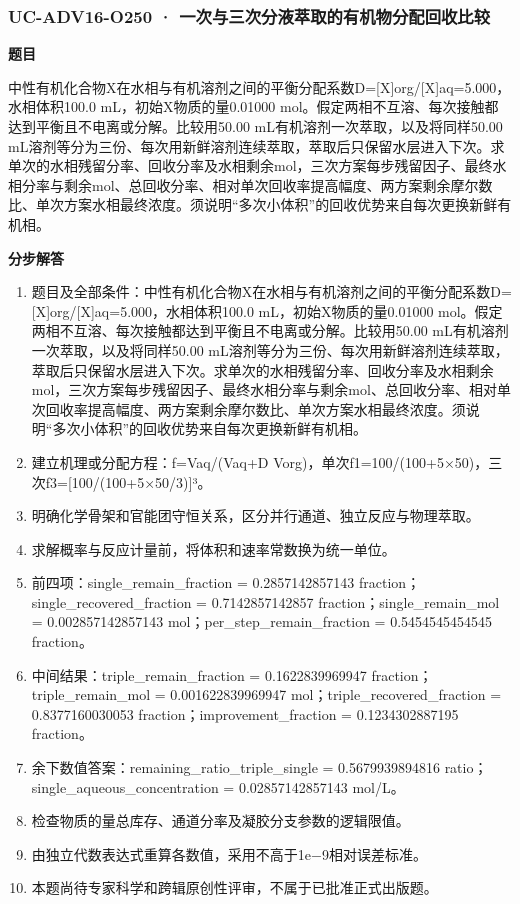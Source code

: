 \documentclass[UTF8,11pt,a4paper]{ctexart}
\begin{document}
\subsubsection*{UC-ADV16-O250 · 一次与三次分液萃取的有机物分配回收比较}
\noindent\textbf{题目}\par
中性有机化合物X在水相与有机溶剂之间的平衡分配系数D=[X]org/[X]aq=5.000，水相体积100.0 mL，初始X物质的量0.01000 mol。假定两相不互溶、每次接触都达到平衡且不电离或分解。比较用50.00 mL有机溶剂一次萃取，以及将同样50.00 mL溶剂等分为三份、每次用新鲜溶剂连续萃取，萃取后只保留水层进入下次。求单次的水相残留分率、回收分率及水相剩余mol，三次方案每步残留因子、最终水相分率与剩余mol、总回收分率、相对单次回收率提高幅度、两方案剩余摩尔数比、单次方案水相最终浓度。须说明“多次小体积”的回收优势来自每次更换新鲜有机相。\par
\medskip\noindent\textbf{分步解答}
\begin{enumerate}
\item 题目及全部条件：中性有机化合物X在水相与有机溶剂之间的平衡分配系数D=[X]org/[X]aq=5.000，水相体积100.0 mL，初始X物质的量0.01000 mol。假定两相不互溶、每次接触都达到平衡且不电离或分解。比较用50.00 mL有机溶剂一次萃取，以及将同样50.00 mL溶剂等分为三份、每次用新鲜溶剂连续萃取，萃取后只保留水层进入下次。求单次的水相残留分率、回收分率及水相剩余mol，三次方案每步残留因子、最终水相分率与剩余mol、总回收分率、相对单次回收率提高幅度、两方案剩余摩尔数比、单次方案水相最终浓度。须说明“多次小体积”的回收优势来自每次更换新鲜有机相。
\item 建立机理或分配方程：f=Vaq/(Vaq+D Vorg)，单次f1=100/(100+5×50)，三次f3=[100/(100+5×50/3)]³。
\item 明确化学骨架和官能团守恒关系，区分并行通道、独立反应与物理萃取。
\item 求解概率与反应计量前，将体积和速率常数换为统一单位。
\item 前四项：single\_remain\_fraction = 0.2857142857143 fraction；single\_recovered\_fraction = 0.7142857142857 fraction；single\_remain\_mol = 0.002857142857143 mol；per\_step\_remain\_fraction = 0.5454545454545 fraction。
\item 中间结果：triple\_remain\_fraction = 0.1622839969947 fraction；triple\_remain\_mol = 0.001622839969947 mol；triple\_recovered\_fraction = 0.8377160030053 fraction；improvement\_fraction = 0.1234302887195 fraction。
\item 余下数值答案：remaining\_ratio\_triple\_single = 0.5679939894816 ratio；single\_aqueous\_concentration = 0.02857142857143 mol/L。
\item 检查物质的量总库存、通道分率及凝胶分支参数的逻辑限值。
\item 由独立代数表达式重算各数值，采用不高于1e−9相对误差标准。
\item 本题尚待专家科学和跨辑原创性评审，不属于已批准正式出版题。
\end{enumerate}
\end{document}
